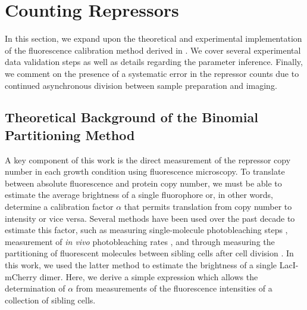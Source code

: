 \documentclass[12pt]{caltech_thesis}
\begin{document}
\hypertarget{counting-repressors-1}{%
\section{Counting Repressors}\label{counting-repressors-1}}

In this section, we expand upon the theoretical and experimental
implementation of the fluorescence calibration method derived in
\textcite{rosenfeld2005}. We cover several experimental data validation
steps as well as details regarding the parameter inference. Finally, we
comment on the presence of a systematic error in the repressor counts
due to continued asynchronous division between sample preparation and
imaging.

\hypertarget{sec:cal_factor}{%
\subsection{Theoretical Background of the Binomial Partitioning
Method}\label{sec:cal_factor}}

A key component of this work is the direct measurement of the repressor
copy number in each growth condition using fluorescence microscopy. To
translate between absolute fluorescence and protein copy number, we must
be able to estimate the average brightness of a single fluorophore or,
in other words, determine a calibration factor \(\alpha\) that permits
translation from copy number to intensity or vice versa. Several methods
have been used over the past decade to estimate this factor, such as
measuring single-molecule photobleaching steps
\autocite{garcia2011b,bialecka-fornal2012}, measurement of \emph{in
vivo} photobleaching rates \autocite{nayak2011,kim2016}, and through
measuring the partitioning of fluorescent molecules between sibling
cells after cell division
\autocite{rosenfeld2005,rosenfeld2006,brewster2014}. In this work, we
used the latter method to estimate the brightness of a single
LacI-mCherry dimer. Here, we derive a simple expression which allows the
determination of \(\alpha\) from measurements of the fluorescence
intensities of a collection of sibling cells.
\end{document}
